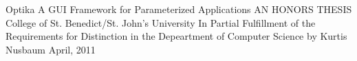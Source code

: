 \begin{titlepage}
\begin{center}
{\huge
Optika
}
\linebreak
\linebreak
{\large
A GUI Framework for Parameterized Applications
}
\linebreak
\linebreak
\linebreak
\linebreak
\linebreak
\linebreak
\linebreak
\linebreak
\linebreak
\linebreak
\linebreak
\linebreak
\linebreak
{AN HONORS THESIS}
\linebreak
\linebreak
College of St. Benedict/St. John's University
\linebreak
\linebreak
In Partial Fulfillment
\linebreak
\linebreak
of the Requirements for Distinction
\linebreak
\linebreak
in the Depeartment of Computer Science
\linebreak
\linebreak
by
\linebreak
\linebreak
Kurtis Nusbaum
\linebreak
\linebreak
April, 2011
\end{center}
\end{titlepage}
